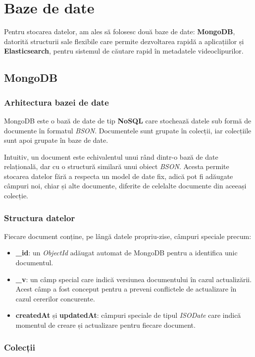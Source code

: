 \section{Baze de date}
Pentru stocarea datelor, am ales să folosesc două baze de date: \textbf{MongoDB}, datorită structurii sale
flexibile care permite dezvoltarea rapidă a aplicațiilor și \textbf{Elasticsearch}, pentru sistemul de căutare
rapid în metadatele videoclipurilor.
\subsection{MongoDB}
\subsubsection{Arhitectura bazei de date}
MongoDB este o bază de date de tip \textbf{NoSQL} care stochează datele sub formă de documente în 
formatul \textit{BSON}. Documentele sunt grupate în colecții, iar colecțiile sunt apoi grupate în
baze de date. 
\par
Intuitiv, un document este echivalentul unui rând dintr-o bază de date relațională, dar cu o structură
similară unui obiect \textit{BSON}. Acesta permite stocarea datelor fără a respecta un model de date fix, adică
pot fi adăugate câmpuri noi, chiar și alte documente, diferite de celelalte documente din aceeași colecție.

\subsubsection{Structura datelor}

\par
Fiecare document conține, pe lângă datele propriu-zise, câmpuri speciale precum:
\begin{itemize}
    \item \textbf{\_id}: un \textit{ObjectId} adăugat automat de MongoDB pentru a identifica unic documentul.
    \item \textbf{\_v}: un câmp special care indică versiunea documentului în cazul actualizării. Acest
    câmp a fost conceput pentru a preveni conflictele de actualizare în cazul cererilor concurente.
    \item \textbf{createdAt} și \textbf{updatedAt}: câmpuri speciale de tipul \textit{ISODate} care
    indică momentul de creare și actualizare pentru fiecare document.
\end{itemize}

\subsubsection{Colecții}

